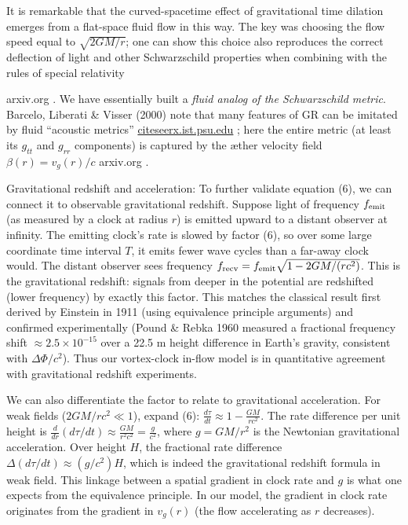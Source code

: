 \documentclass[aps,preprint,superscriptaddress]{revtex4}
\begin{document}
It is remarkable that the curved-spacetime effect of gravitational time dilation emerges from a flat-space fluid flow in this way. The key was choosing the flow speed equal to $\sqrt{2GM/r}$; one can show this choice also reproduces the correct deflection of light and other Schwarzschild properties when combining with the rules of special relativity

arxiv.org
. We have essentially built a \textit{fluid analog of the Schwarzschild metric}. Barcelo, Liberati & Visser (2000) note that many features of GR can be imitated by fluid “acoustic metrics” \href{https://citeseerx.ist.psu.edu/document?repid=rep1&type=pdf&doi=25483f1ebc9dc442a9f1505a49d96eb35e92e3f4#:~:text=References%201,in%20Cantorian%20space%20and%20average}{citeseerx.ist.psu.edu}
; here the entire metric (at least its $g_{tt}$ and $g_{rr}$ components) is captured by the æther velocity field $\beta(r)=v_g(r)/c$ arxiv.org
.


Gravitational redshift and acceleration: To further validate equation (6), we can connect it to observable gravitational redshift. Suppose light of frequency $f_{\rm emit}$ (as measured by a clock at radius $r$) is emitted upward to a distant observer at infinity. The emitting clock’s rate is slowed by factor (6), so over some large coordinate time interval $T$, it emits fewer wave cycles than a far-away clock would. The distant observer sees frequency $f_{\rm recv} = f_{\rm emit}\sqrt{1-2GM/(rc^2)}$. This is the gravitational redshift: signals from deeper in the potential are redshifted (lower frequency) by exactly this factor. This matches the classical result first derived by Einstein in 1911 (using equivalence principle arguments) and confirmed experimentally (Pound & Rebka 1960 measured a fractional frequency shift $\approx 2.5\times10^{-15}$ over a 22.5 m height difference in Earth’s gravity, consistent with $\Delta \Phi/c^2$). Thus our vortex-clock in-flow model is in quantitative agreement with gravitational redshift experiments.


We can also differentiate the factor to relate to gravitational acceleration. For weak fields ($2GM/rc^2 \ll 1$), expand (6): $\frac{d\tau}{dt} \approx 1 - \frac{GM}{r c^2}$. The rate difference per unit height is $\frac{d}{dr}(d\tau/dt) \approx \frac{GM}{r^2 c^2} = \frac{g}{c^2}$, where $g=GM/r^2$ is the Newtonian gravitational acceleration. Over height $H$, the fractional rate difference $\Delta(d\tau/dt) \approx (g/c^2) H$, which is indeed the gravitational redshift formula in weak field. This linkage between a spatial gradient in clock rate and $g$ is what one expects from the equivalence principle. In our model, the gradient in clock rate originates from the gradient in $v_g(r)$ (the flow accelerating as $r$ decreases).
\end{document}

